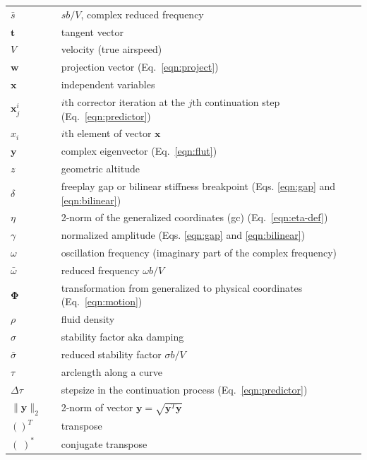 \documentclass[11pt,openany,twoside]{book}
\numberwithin{equation}{section}		%
\newcommand{\Code}[1]{{\small\tt #1}}
\newcommand{\Matrix}[1]{\boldsymbol{#1}}
\newcommand{\Vector}[1]{\boldsymbol{#1}}
\newcommand{\Step}{\Delta\tau}
\newcommand{\Gc}{gc}
\newcommand{\Eqn}[1]{Eq.\ \ref{#1}}  %
\newcommand{\Eqna}[2]{Eqs. \ref{#1} and \ref{#2}}  %
\begin{document}
\begin{longtable}{@{}lcl@{}}
$\bar{s}$ & & $sb/V$, complex reduced frequency \\
$\Vector{t}$ & & tangent vector \\
$V$ & & velocity (true airspeed) \\
$\Vector{w}$ & & projection vector (\Eqn{eqn:project}) \\
$\Vector{x}$ & & independent variables \\
$\Vector{x}_j^i$ & & $i\text{th}$ corrector iteration at the $j\text{th}$
   continuation step (\Eqn{eqn:predictor}) \\
$x_i$ & & $i\text{th}$ element of vector $\Vector{x}$ \\
$\Vector{y}$ & & complex eigenvector (\Eqn{eqn:flut}) \\
$z$ & & geometric altitude \\
$\delta$ & & freeplay gap or bilinear stiffness breakpoint (\Eqna{eqn:gap}{eqn:bilinear}) \\
$\eta$ & & 2-norm of the generalized coordinates (\Gc) (\Eqn{eqn:eta-def}) \\
$\gamma$ & & normalized amplitude (\Eqna{eqn:gap}{eqn:bilinear}) \\
$\omega$ & & oscillation frequency (imaginary part of the complex frequency) \\
$\bar{\omega}$ & & reduced frequency $\omega b/V$ \\
$\Matrix{\Phi}$ & & transformation from generalized to physical coordinates (\Eqn{eqn:motion}) \\
$\rho$ & & fluid density \\
$\sigma$ & & stability factor aka damping \\
$\bar{\sigma}$ & & reduced stability factor $\sigma b/V$ \\
$\tau$ & & arclength along a curve \\
$\Step$ & & stepsize in the continuation process (\Eqn{eqn:predictor}) \\
$\|\Vector{y}\|_2$ & & 2-norm of vector $\Vector{y} =
   \sqrt{\Vector{y}^T\Vector{y}}$ \index{2-norm}\\
$()^T$ & & transpose \\
$(\;)^*$ & & conjugate transpose \\
\end{longtable}
\end{document}
